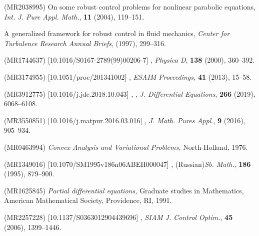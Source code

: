 \documentclass{dcds-bOF}
\theoremstyle{definition}
\begin{document}
\begin{thebibliography}{99}
 (MR2038995)
\newblock On some robust control problems for nonlinear parabolic equations,
\newblock \emph{Int. J. Pure Appl. Math.}, \textbf{11} (2004), 119--151.

\newblock A generalized framework for robust control in fluid mechanics,
\newblock \emph{Center for Turbulence Research Annual Briefs}, (1997), 299--316.

 (MR1744637) [10.1016/S0167-2789(99)00206-7]
\newblock {},
\newblock \emph{Physica D}, \textbf{138} (2000), 360--392.

 (MR3174955) [10.1051/proc/201341002]
\newblock {},
\newblock \emph{ESAIM Proceedings,} \textbf{41} (2013), 15--58.

 (MR3912775) [10.1016/j.jde.2018.10.043]
,
\newblock {},
\newblock \emph{J. Differential Equations}, \textbf{266} (2019), 6068--6108.

 (MR3550851) [10.1016/j.matpur.2016.03.016]
\newblock {},
\newblock \emph{J. Math. Pures Appl.}, \textbf{9} (2016), 905--934.

 (MR0463994)
\newblock \emph{Convex Analysis and Variational Problems,}
\newblock North-Holland, 1976.

 (MR1349016) [10.1070/SM1995v186n06ABEH000047]
\newblock {},
\newblock (Russian)\emph{Sb. Math.}, \textbf{186} (1995),  879--900.

 (MR1625845)
\newblock \emph{Partial \emph{differential equa}tions,}
\newblock Graduate studies in Mathematics, American Mathematical Society, Providence, RI, 1991.

 (MR2257228) [10.1137/S0363012904439696]
\newblock {},
\newblock \emph{SIAM J. Control Optim.}, \textbf{45} (2006), 1399--1446.


\end{thebibliography}
\end{document}
